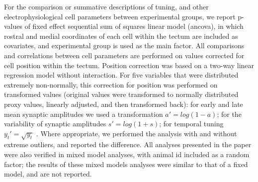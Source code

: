 \documentclass{article}
\begin{document}
For the comparison or summative descriptions of tuning, and other electrophysiological cell parameters between experimental groups, we report p-values of fixed effect sequential sum of squares linear model (ancova), in which rostral and medial coordinates of each cell within the tectum are included as covariates, and experimental group is used as the main factor. All comparisons and correlations between cell parameters are performed on values corrected for cell position within the tectum. Position correction was based on a two-way linear regression model without interaction. For five variables that were distributed extremely non-normally, this correction for position was performed on transformed values (original values were transformed to normally distributed proxy values, linearly adjusted, and then transformed back): for early and late mean synaptic amplitudes we used a transformation $a'=log(1-a)$; for the variability of synaptic amplitudes $s'=log(1+s)$; for temporal tuning $y_t' = \sqrt{y_t}$ . Where appropriate, we performed the analysis with and without extreme outliers, and reported the difference. All analyses presented in the paper were also verified in mixed model analyses, with animal id included as a random factor; the results of these mixed models analyses were similar to that of a fixed model, and are not reported.

\nolinenumbers


\end{document}
